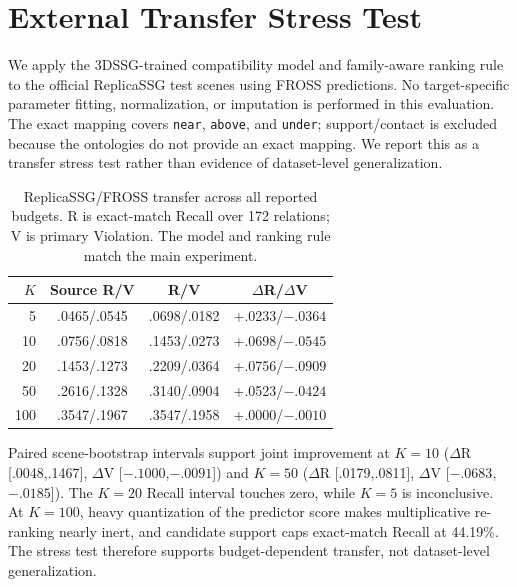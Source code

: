 \section{External Transfer Stress Test}

We apply the 3DSSG-trained compatibility model and family-aware ranking rule to
the official ReplicaSSG test scenes using FROSS predictions. No target-specific
parameter fitting, normalization, or imputation is performed in this evaluation.
The exact mapping covers \texttt{near}, \texttt{above}, and \texttt{under};
support/contact is excluded because the ontologies do not provide an exact
mapping. We report this as a transfer stress test rather than evidence of
dataset-level generalization.

\begin{table}[t]
\centering
{\small
\setlength{\tabcolsep}{3.6pt}
\begin{tabular}{rccc}
\toprule
$K$ & Source R/V & \method{} R/V & $\Delta$R/$\Delta$V \\
\midrule
5   & .0465/.0545 & .0698/.0182 & +.0233/$-.0364$ \\
10  & .0756/.0818 & .1453/.0273 & +.0698/$-.0545$ \\
20  & .1453/.1273 & .2209/.0364 & +.0756/$-.0909$ \\
50  & .2616/.1328 & .3140/.0904 & +.0523/$-.0424$ \\
100 & .3547/.1967 & .3547/.1958 & +.0000/$-.0010$ \\
\bottomrule
\end{tabular}
}
\caption{ReplicaSSG/FROSS transfer across all reported budgets. R is exact-match
Recall over 172 relations; V is primary Violation. The model and ranking rule
match the main experiment.}
\label{tab:replica-transfer}
\end{table}

Paired scene-bootstrap intervals support joint improvement at $K=10$
($\Delta$R [.0048,.1467], $\Delta$V [$-.1000$,$-.0091$]) and $K=50$
($\Delta$R [.0179,.0811], $\Delta$V [$-.0683$,$-.0185$]). The $K=20$
Recall interval touches zero, while $K=5$ is inconclusive. At $K=100$, heavy
quantization of the predictor score makes multiplicative re-ranking nearly inert, and
candidate support caps exact-match Recall at 44.19\%. The stress test therefore
supports budget-dependent transfer, not dataset-level generalization.
